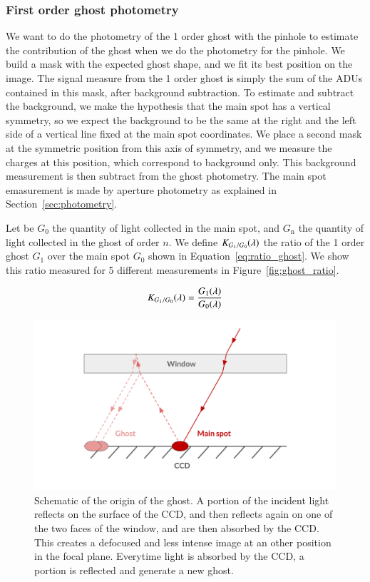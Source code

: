 \subsubsection{First order ghost photometry}

 We want to do the photometry of the 1 order ghost with the \spinhole pinhole to estimate the contribution of the ghost when we do the photometry for the \bpinhole pinhole. We build a mask with the expected ghost shape, and we fit its best position on the image. The signal measure from the 1 order ghost is simply the sum of the ADUs contained in this mask, after background subtraction. To estimate and subtract the background, we make the hypothesis that the main spot has a vertical symmetry, so we expect the background to be the same at the right and the left side of a vertical line fixed at the main spot coordinates. We place a second mask at the symmetric position from this axis of symmetry, and we measure the charges at this position, which correspond to background only. This background measurement is then subtract from the ghost photometry. The main spot emasurement is made by aperture photometry as explained in Section~\ref{sec:photometry}. 
 
 Let be $G_0$ the quantity of light collected in the main spot, and $G_\mathrm{n}$ the quantity of light collected in the ghost of order $n$. We define $K_{G_1/G_0}(\lambda)$ the ratio of the 1 order ghost $G_1$ over the main spot $G_0$ shown in Equation~\ref{eq:ratio_ghost}. We show this ratio measured for 5 different measurements in Figure~\ref{fig:ghost_ratio}.

\begin{equation}
    K_{G_1/G_0}(\lambda) = \frac{G_1(\lambda)}{G_0(\lambda)}
    \label{eq:ratio_ghost}
\end{equation}

\begin{figure}[h]
    \centering
    \includegraphics[width=\columnwidth]{fig/schema_ghost.pdf}
    \caption{Schematic of the origin of the ghost. A portion of the incident light reflects on the surface of the CCD, and then reflects again on one of the two faces of the window, and are then absorbed by the CCD. This creates a defocused and less intense image at an other position in the focal plane. Everytime light is absorbed by the CCD, a portion is reflected and generate a new ghost.}
    \label{fig:schema_ghost}
\end{figure}

